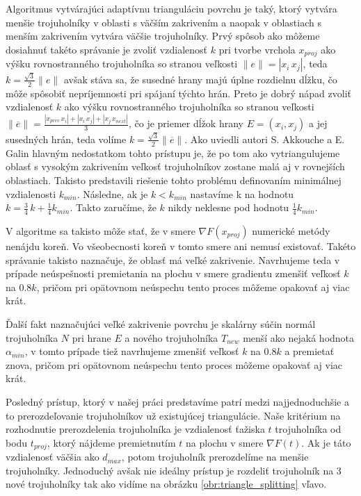 Algoritmus vytvárajúci adaptívnu trianguláciu povrchu je taký, ktorý vytvára menšie trojuholníky v oblasti 
s väčším zakrivením a naopak v oblastiach s menším zakrivením vytvára väčšie trojuholníky.
Prvý spôsob ako môžeme dosiahnuť takéto správanie je zvoliť vzdialenosť $k$ pri tvorbe vrchola $x_{proj}$
ako výšku rovnostranného trojuholníka so stranou veľkosti $\|e\| = | x_i \, x_j |$, teda 
$k=\frac{\sqrt 3}{2} \| e \|$ avšak stáva sa, že susedné
hrany majú úplne rozdielnu dĺžku, čo môže spôsobiť nepríjemnosti pri spájaní týchto hrán. 
Preto je dobrý nápad zvoliť vzdialenosť $k$ ako výšku rovnostranného trojuholníka so stranou veľkosti
$\| \overline{e} \| = \frac{| x_{prev} \, x_i | + | x_i \, x_j | + | x_j \, x_{next} |}{3}$, čo je 
priemer dĺžok hrany
$E = (x_i, x_j)$ a jej susedných hrán, teda volíme $k=\frac{\sqrt 3}{2} \| \overline{e} \|$. 
Ako uviedli autori S. Akkouche a E. Galin \cite{akkouche2001adaptive}
hlavným nedostatkom tohto prístupu je, že po tom ako vytriangulujeme oblasť s vysokým zakrivením 
veľkosť trojuholníkov zostane malá aj v rovnejších oblastiach. Takisto predstavili riešenie tohto 
problému definovaním minimálnej vzdialenosti $k_{min}$. Následne, ak je $k < k_{min}$ 
nastavíme k na hodnotu $k = \frac{3}{4} \, k + \frac{1}{4} k_{min}$. Takto zaručíme, že $k$ nikdy neklesne
pod hodnotu $\frac{1}{4} k_{min}$. 

V algoritme sa takisto môže stať, že v smere $\nabla F(x_{proj})$ numerické metódy nenájdu koreň. 
Vo všeobecnosti koreň v tomto smere ani nemusí existovať. Takéto správanie takisto naznačuje, že oblasť
má veľké zakrivenie. Navrhujeme teda v prípade neúspešnosti premietania na plochu v smere gradientu 
zmenšiť veľkosť $k$ na $0.8 k$, pričom pri opätovnom neúspechu tento proces môžeme opakovať aj viac 
krát. 

Ďalší fakt naznačujúci veľké zakrivenie povrchu je skalárny súčin normál trojuholníka $N$ pri hrane $E$
a nového trojuholníka $T_{new}$ menší ako nejaká hodnota $\alpha_{min}$, v tomto prípade tiež navrhujeme
zmenšiť veľkosť $k$ na $0.8 k$ a premietať znova, pričom pri opätovnom neúspechu tento proces 
môžeme opakovať aj viac krát.

Posledný prístup, ktorý v našej práci predstavíme patrí medzi najjednoduchšie a to prerozdeľovanie 
trojuholníkov už existujúcej triangulácie. Naše kritérium na rozhodnutie prerozdelenia trojuholníka
je vzdialenosť ťažiska $t$ trojuholníka od bodu $t_{proj}$, ktorý nájdeme premietnutím $t$ na plochu
v smere $\nabla F(t)$. Ak je táto vzdialenosť väčšia ako $d_{max}$, potom trojuholník prerozdelíme 
na menšie trojuholníky. Jednoduchý avšak nie ideálny prístup je rozdeliť trojuholník na 3 nové 
trojuholníky tak ako vidíme na obrázku \ref{obr:triangle_splitting} vľavo. 

